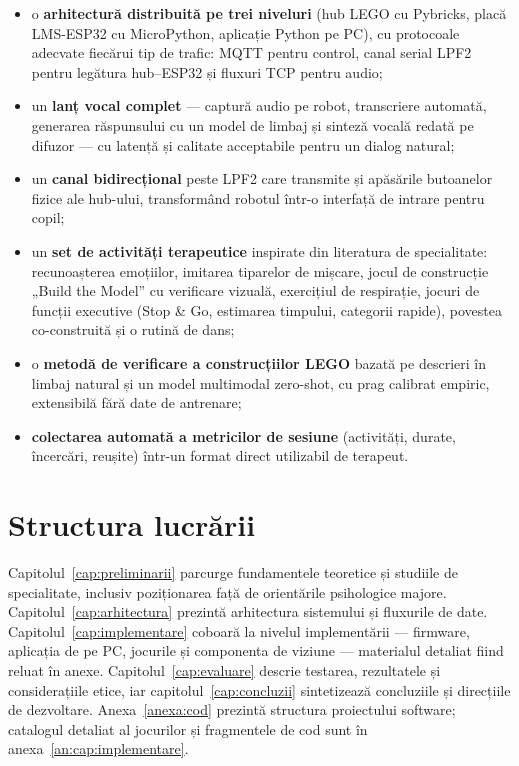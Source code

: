 \begin{itemize}
    \item o \textbf{arhitectură distribuită pe trei niveluri} (hub LEGO cu Pybricks, placă LMS-ESP32 cu MicroPython, aplicație Python pe PC), cu protocoale adecvate fiecărui tip de trafic: MQTT pentru control, canal serial LPF2 pentru legătura hub--ESP32 și fluxuri TCP pentru audio;
    \item un \textbf{lanț vocal complet} — captură audio pe robot, transcriere automată, generarea răspunsului cu un model de limbaj și sinteză vocală redată pe difuzor — cu latență și calitate acceptabile pentru un dialog natural;
    \item un \textbf{canal bidirecțional} peste LPF2 care transmite și apăsările butoanelor fizice ale hub-ului, transformând robotul într-o interfață de intrare pentru copil;
    \item un \textbf{set de activități terapeutice} inspirate din literatura de specialitate: recunoașterea emoțiilor, imitarea tiparelor de mișcare, jocul de construcție „Build the Model” cu verificare vizuală, exercițiul de respirație, jocuri de funcții executive (Stop \& Go, estimarea timpului, categorii rapide), povestea co-construită și o rutină de dans;
    \item o \textbf{metodă de verificare a construcțiilor LEGO} bazată pe descrieri în limbaj natural și un model multimodal zero-shot, cu prag calibrat empiric, extensibilă fără date de antrenare;
    \item \textbf{colectarea automată a metricilor de sesiune} (activități, durate, încercări, reușite) într-un format direct utilizabil de terapeut.
\end{itemize}

\section{Structura lucrării}

Capitolul~\ref{cap:preliminarii} parcurge fundamentele teoretice și studiile de specialitate, inclusiv poziționarea față de orientările psihologice majore. Capitolul~\ref{cap:arhitectura} prezintă arhitectura sistemului și fluxurile de date. Capitolul~\ref{cap:implementare} coboară la nivelul implementării — firmware, aplicația de pe PC, jocurile și componenta de viziune — materialul detaliat fiind reluat în anexe. Capitolul~\ref{cap:evaluare} descrie testarea, rezultatele și considerațiile etice, iar capitolul~\ref{cap:concluzii} sintetizează concluziile și direcțiile de dezvoltare. Anexa~\ref{anexa:cod} prezintă structura proiectului software; catalogul detaliat al jocurilor și fragmentele de cod sunt în anexa~\ref{an:cap:implementare}.
